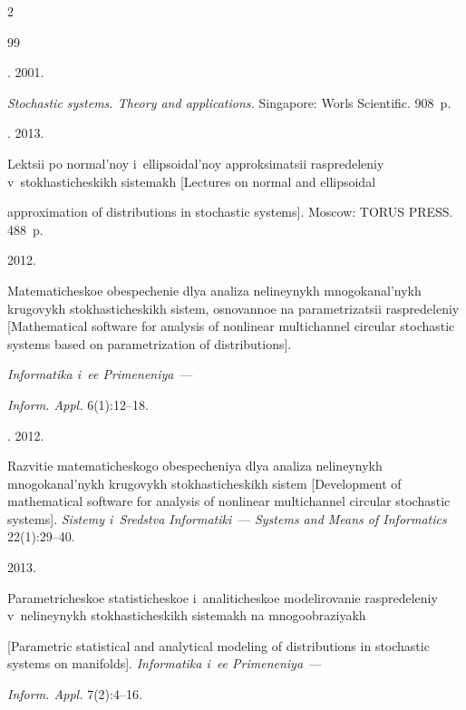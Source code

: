 \begin{multicols}{2}
{{\begin{thebibliography}{99}

. 2001.

\textit{Stochastic systems. Theory and  applications.} Singapore: Worls Scientific. 908~p.




.  2013.

Lektsii po normal'noy i~ellipsoidal'noy approksimatsii raspredeleniy v~stokhasticheskikh sistemakh [Lectures on normal and ellipsoidal

approximation of distributions in stochastic systems]. Moscow: TORUS PRESS. 488~p.












 2012.

Matematicheskoe obespechenie dlya analiza nelineynykh mnogokanal'nykh krugovykh stokhasticheskikh sistem, osnovannoe na parametrizatsii raspredeleniy [Mathematical software for analysis of nonlinear multichannel circular stochastic systems based on parametrization of distributions].

\textit{Informatika i~ee Primeneniya}~---

 \textit{Inform. Appl.} 6(1):12--18.




. 2012.

Razvitie matematicheskogo obespecheniya dlya analiza nelineynykh mno\-go\-ka\-nal'\-nykh krugovykh stokhasticheskikh sistem [Development of mathematical software for analysis of nonlinear multichannel circular stochastic systems]. \textit{Sistemy i~Sredstva Informatiki}~--- \textit{Systems and Means of Informatics} 22(1):29--40.




  2013.

Parametricheskoe statisticheskoe i~analiticheskoe modelirovanie raspredeleniy v~ne\-li\-ney\-nykh stokhasticheskikh sistemakh na mno\-go\-ob\-ra\-zi\-yakh

[Parametric statistical and analytical modeling of distributions in stochastic systems on manifolds]. \textit{Informatika i~ee Primeneniya}~---

 \textit{Inform. Appl.} 7(2):4--16.

\end{thebibliography}



 }

 }



\end{multicols}



